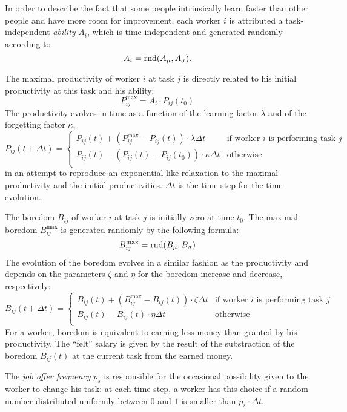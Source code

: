 In order to describe the fact that some people intrinsically learn faster than other people and have more room for improvement, each worker $i$ is attributed a task-independent \emph{ability} $A_i$, which is time-independent and generated randomly according to
\begin{equation}
	A_{i} = \mathrm{rnd}(A_\mu,A_\sigma).
\end{equation}

The maximal productivity of worker $i$ at task $j$ is directly related to his initial productivity at this task and his ability:
\begin{equation}
	P_{ij}^\textrm{max} = A_i \cdot P_{ij}(t_0)
\end{equation}
The productivity evolves in time as a function of the learning factor $\lambda$ and of the forgetting factor $\kappa$, 
\begin{equation}
	P_{ij}(t+\Delta t) = \begin{cases}
		P_{ij}(t) + (P_{ij}^\textrm{max}-P_{ij}(t)) \cdot \lambda \Delta t & \text{if worker $i$ is performing task $j$}\\
		P_{ij}(t) - (P_{ij}(t)-P_{ij}(t_0)) \cdot \kappa \Delta t & \text{otherwise}\\
		\end{cases}
\end{equation}
in an attempt to reproduce an exponential-like relaxation to the maximal productivity and the initial productivities. $\Delta t$ is the time step for the time evolution.

The boredom $B_{ij}$ of worker $i$ at task $j$ is initially zero at time $t_0$. The maximal boredom $B_{ij}^\textrm{max}$ is generated randomly by the following formula:
\begin{equation}
	B_{ij}^\textrm{max} = \mathrm{rnd}(B_\mu,B_\sigma)
\end{equation}
The evolution of the boredom evolves in a similar fashion as the productivity and depends on the parameters $\zeta$ and $\eta$ for the boredom increase and decrease, respectively:
\begin{equation}
	B_{ij}(t+\Delta t) = \begin{cases}
		B_{ij}(t) + (B_{ij}^\textrm{max}-B_{ij}(t)) \cdot \zeta \Delta t & \text{if worker $i$ is performing task $j$}\\
		B_{ij}(t) - B_{ij}(t) \cdot \eta \Delta t & \text{otherwise}\\
		\end{cases}
\end{equation}
For a worker, boredom is equivalent to earning less money than granted by his productivity. The ``felt'' salary is given by the result of the substraction of the boredom $B_{ij}(t)$ at the current task from the earned money.

The \emph{job offer frequency} $p_s$ is responsible for the occasional possibility given to the worker to change his task: at each time step, a worker has this choice if a random number distributed uniformly between $0$ and $1$ is smaller than $p_s \cdot \Delta t$.

